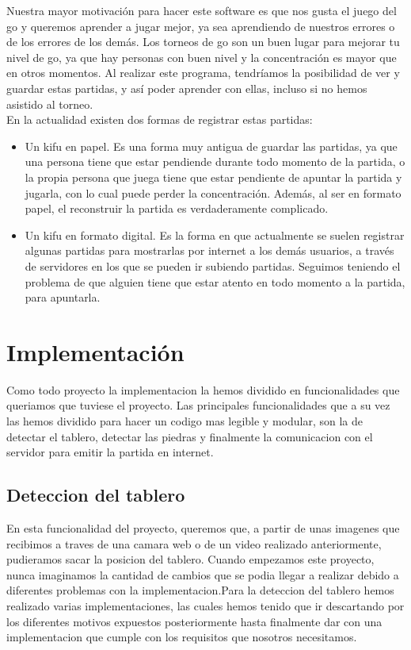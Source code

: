 \documentclass[12pt,a4paper]{report}
\begin{document}
Nuestra mayor motivación para hacer este software es que nos gusta el juego del
go y queremos aprender a jugar mejor, ya sea aprendiendo de nuestros errores o de los
errores de los demás. Los torneos de go son un buen lugar para mejorar tu nivel
de go, ya que hay personas con buen nivel y la concentración es mayor que en
otros momentos. 
Al realizar este programa, tendríamos la posibilidad de ver y
guardar estas partidas, y así poder aprender con ellas, incluso si no hemos
asistido al torneo.
\\
En la actualidad existen dos formas de registrar estas partidas: 
\begin{itemize}
\item Un kifu en papel. Es una forma muy antigua de guardar las partidas, ya que
una persona tiene que estar pendiende durante todo momento de la partida, o la
propia persona que juega tiene que estar pendiente de apuntar la partida y
jugarla, con lo cual puede perder la concentración. Además, al ser en formato
papel, el reconstruir la partida es verdaderamente complicado. 
\item Un kifu en formato digital. Es la forma en que actualmente se suelen
registrar algunas partidas para mostrarlas por internet a los demás usuarios, a
través de servidores en los que se pueden ir subiendo partidas. Seguimos
teniendo el problema de que alguien tiene que estar atento en todo momento a la
partida, para apuntarla. 
\end{itemize}



\chapter{Implementación}
Como todo proyecto la implementacion la hemos dividido en funcionalidades que queriamos que tuviese el proyecto. Las principales funcionalidades que a su vez las hemos dividido para hacer un codigo mas legible y modular, son la de detectar el tablero, detectar las piedras y finalmente la comunicacion con el servidor para emitir la partida en internet.

\section{Deteccion del tablero}
En esta funcionalidad del proyecto, queremos que, a partir de unas imagenes que recibimos a traves de una camara web o de un video realizado anteriormente, pudieramos sacar la posicion del tablero.
Cuando empezamos este proyecto, nunca imaginamos la cantidad de cambios que se podia llegar a realizar debido a diferentes problemas con la implementacion.Para la deteccion del tablero hemos realizado varias implementaciones, las cuales hemos tenido que ir descartando por los diferentes motivos expuestos posteriormente hasta finalmente dar con una implementacion que cumple con los requisitos que nosotros necesitamos.
\end{document}
